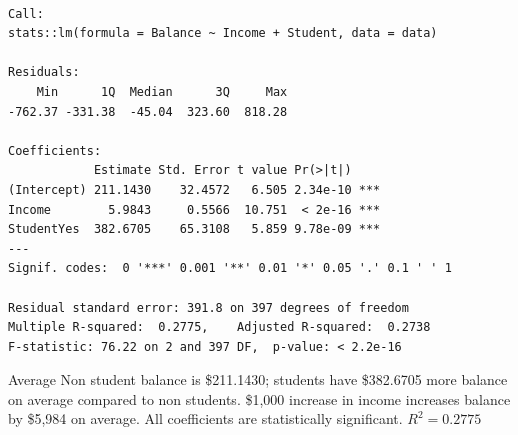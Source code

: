 \documentclass[
  letterpaper,
  DIV=11,
  numbers=noendperiod]{scrreprt}
\begin{document}
\begin{verbatim}

Call:
stats::lm(formula = Balance ~ Income + Student, data = data)

Residuals:
    Min      1Q  Median      3Q     Max 
-762.37 -331.38  -45.04  323.60  818.28 

Coefficients:
            Estimate Std. Error t value Pr(>|t|)    
(Intercept) 211.1430    32.4572   6.505 2.34e-10 ***
Income        5.9843     0.5566  10.751  < 2e-16 ***
StudentYes  382.6705    65.3108   5.859 9.78e-09 ***
---
Signif. codes:  0 '***' 0.001 '**' 0.01 '*' 0.05 '.' 0.1 ' ' 1

Residual standard error: 391.8 on 397 degrees of freedom
Multiple R-squared:  0.2775,    Adjusted R-squared:  0.2738 
F-statistic: 76.22 on 2 and 397 DF,  p-value: < 2.2e-16
\end{verbatim}

Average Non student balance is \$211.1430; students have \$382.6705 more
balance on average compared to non students. \$1,000 increase in income
increases balance by \$5,984 on average. All coefficients are
statistically significant. \(R^2 = 0.2775\)
\end{document}
